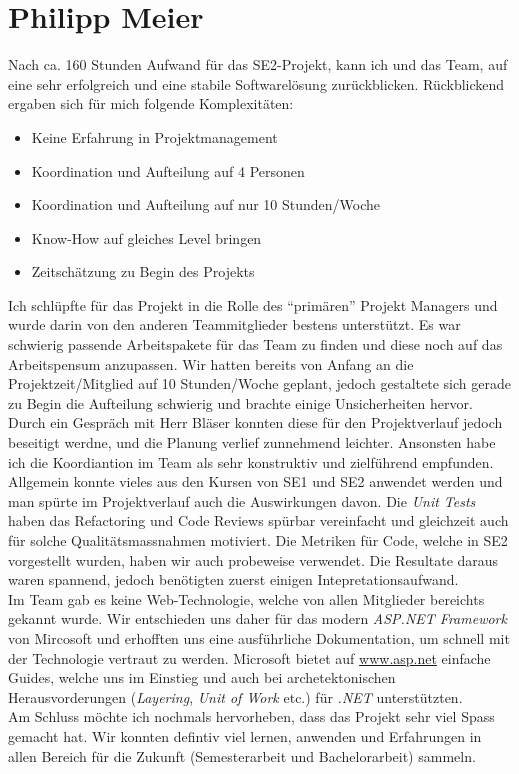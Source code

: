 	\section{Philipp Meier}
	Nach ca. 160 Stunden Aufwand für das SE2-Projekt, kann ich und das Team, auf eine sehr erfolgreich und eine stabile Softwarelösung zurückblicken. Rückblickend ergaben sich für mich folgende Komplexitäten:
	\\\begin{itemize}
		\item Keine Erfahrung in Projektmanagement
		\item Koordination und Aufteilung auf 4 Personen
		\item Koordination und Aufteilung auf nur 10 Stunden/Woche
		\item Know-How auf gleiches Level bringen
		\item Zeitschätzung zu Begin des Projekts
	\end{itemize}
	Ich schlüpfte für das Projekt in die Rolle des \enquote{primären} Projekt Managers und wurde darin von den anderen Teammitglieder bestens unterstützt. Es war schwierig passende Arbeitspakete für das Team zu finden und diese noch auf das Arbeitspensum anzupassen. Wir hatten bereits von Anfang an die Projektzeit/Mitglied auf 10 Stunden/Woche geplant, jedoch gestaltete sich gerade zu Begin die Aufteilung schwierig und brachte einige Unsicherheiten hervor. Durch ein Gespräch mit Herr Bläser konnten diese für den Projektverlauf jedoch beseitigt werdne, und die Planung verlief zunnehmend leichter. Ansonsten habe ich die Koordiantion im Team als sehr konstruktiv und zielführend empfunden.
	\\Allgemein konnte vieles aus den Kursen von SE1 und SE2 anwendet werden und man spürte im Projektverlauf auch die Auswirkungen davon. Die \textit{Unit Tests} haben das Refactoring und Code Reviews spürbar vereinfacht und gleichzeit auch für solche Qualitätsmassnahmen motiviert. Die Metriken für Code, welche in SE2 vorgestellt wurden, haben wir auch probeweise verwendet. Die Resultate daraus waren spannend, jedoch benötigten zuerst einigen Intepretationsaufwand.
	\\ Im Team gab es keine Web-Technologie, welche von allen Mitglieder bereichts gekannt wurde. Wir entschieden uns daher für das modern \textit{ASP.NET Framework} von Mircosoft und erhofften uns eine ausführliche Dokumentation, um schnell mit der Technologie vertraut zu werden. 
	Microsoft bietet auf \href{http://www.asp.net/}{www.asp.net} einfache Guides, welche uns im Einstieg und auch bei archetektonischen Herausvorderungen (\textit{Layering}, \textit{Unit of Work} etc.) für \textit{.NET} unterstützten. 
	\\ Am Schluss möchte ich nochmals hervorheben, dass das Projekt sehr viel Spass gemacht hat. Wir konnten defintiv viel lernen, anwenden und Erfahrungen in allen Bereich für die Zukunft (Semesterarbeit und Bachelorarbeit) sammeln.


